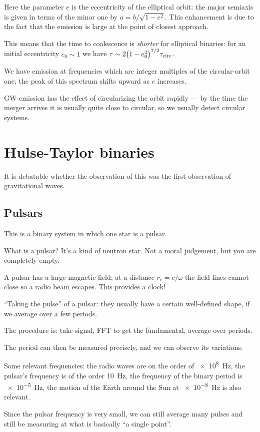 \documentclass[main.tex]{subfiles}
\begin{document}
Here the parameter \(e\) is the eccentricity of the elliptical orbit: the major semiaxis is given in terms of the minor one by \(a = b / \sqrt{1 - e^2}\).
This enhancement is due to the fact that the emission is large at the point of closest approach. 

This means that the time to coalescence is \emph{shorter} for elliptical binaries: for an initial eccentricity \(e_0 \sim 1\) we have \(\tau \sim 2 \qty(1- e_0^2)^{7/2} \tau _{\text{circ}}\).

We have emission at frequencies which are integer multiples of the circular-orbit one; the peak of this spectrum shifts upward as \(e\) increases. 

GW emission has the effect of circularizing the orbit rapidly --- by the time the merger arrives it is usually quite close to circular, so we usually detect circular systems. 

\section{Hulse-Taylor binaries}


It is debatable whether the observation of this was the first observation of gravitational waves. 

\subsection{Pulsars}


This is a binary system in which one star is a pulsar. 

What is a pulsar? It's a kind of neutron star.
Not a moral judgement, but you are completely empty.

A pulsar has a large magnetic field; at a distance \(r_c = c/\omega \) the field lines cannot close so a radio beam escapes. 
This provides a clock!

``Taking the pulse'' of a pulsar: they usually have a certain well-defined shape, if we average over a few periods. 

The procedure is: take signal, FFT to get the fundamental, average over periods. 

The period can then be measured precisely, and we can observe its variations. 

Some relevant frequencies: the radio waves are on the order of \SI{e8}{Hz}, the pulsar's frequency is of the order \SI{10}{Hz}, the frequency of the binary period is \SI{e-5}{Hz}, the motion of the Earth around the Sun at \SI{e-8}{Hz} is also relevant. 

Since the pulsar frequency is very small, we can still average many pulses and still be measuring at what is basically ``a single point''. 
\end{document}
